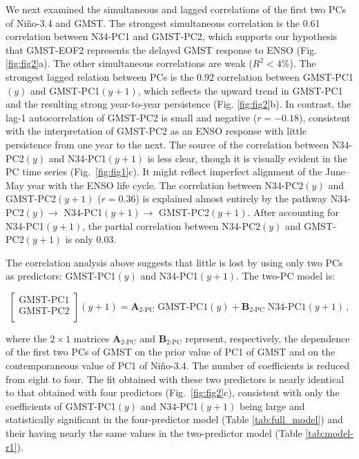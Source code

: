 \documentclass[draft]{agujournal2019}
\begin{document}
We next examined the simultaneous and lagged correlations of the first two PCs of Ni\~no-3.4 and GMST. The strongest simultaneous correlation is the 0.61 correlation between N34-PC1 and GMST-PC2, which supports our hypothesis that GMST-EOF2 represents the delayed GMST response to ENSO (Fig. \ref{fig:fig2}a). The other simultaneous correlations are weak ($R^2 < 4\%$). The strongest lagged relation between PCs is the 0.92 correlation between GMST-PC1$(y)$ and GMST-PC1$(y+1)$, which reflects the upward trend in GMST-PC1 and the resulting strong year-to-year persistence (Fig. \ref{fig:fig2}b).  In contrast, the lag-1 autocorrelation of GMST-PC2 is small and negative ($r=-0.18$), consistent with the interpretation of GMST-PC2 as an ENSO response with little persistence from one year to the next. The source of the correlation between N34-PC2$(y)$ and N34-PC1$(y+1)$ is less clear, though it is visually evident in the PC time series (Fig.\ \ref{fig:fig1}c). It might reflect imperfect alignment of the June--May year with the ENSO life cycle. The correlation between N34-PC2$(y)$ and GMST-PC2$(y+1)$ ($r=0.36$) is explained almost entirely by the pathway N34-PC2$(y) \rightarrow$ N34-PC1$(y+1) \rightarrow$ GMST-PC2$(y+1)$. After accounting for N34-PC1$(y+1)$, the partial correlation between N34-PC2$(y)$ and GMST-PC2$(y+1)$ is only 0.03.

The correlation analysis above suggests that little is lost by using only two PCs as predictors: GMST-PC1$(y)$ and N34-PC1$(y+1)$. The two-PC model is: \begin{linenomath*}
\begin{equation} \begin{bmatrix} \text{GMST-PC1}\\ \text{GMST-PC2}\\ \end{bmatrix}(y+1) = \bm{A}_{\text{2-PC}} \; \text{GMST-PC1} (y) + \bm{B}_{\text{2-PC}} \; \text{N34-PC1} (y+1)\,, \label{eq:pc2} \end{equation}
\end{linenomath*} where the $2 \times 1$ matrices $\bm{A}_{\text{2-PC}}$ and $\bm{B}_{\text{2-PC}}$ represent, respectively, the dependence of the first two PCs of GMST on the prior value of PC1 of GMST and on the contemporaneous value of PC1 of Ni\~no-3.4. The number of coefficients is reduced from eight to four. The fit obtained with these two predictors is nearly identical to that obtained with four predictors (Fig.\ \ref{fig:fig2}c), consistent with only the coefficients of GMST-PC1$(y)$ and N34-PC1$(y+1)$ being large and statistically significant in the four-predictor model (Table \ref{tab:full_model}) and their having nearly the same values in the two-predictor model (Table \ref{tab:model-r1}).
\end{document}
